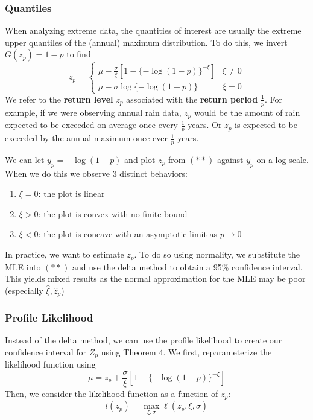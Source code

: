 \documentclass{article}
\theoremstyle{definition}
\theoremstyle{definition}
\def\l{\ell}
\begin{document}
\subsubsection{Quantiles}
When analyzing extreme data, the quantities of interest are usually the extreme upper quantiles of the (annual) maximum distribution. To do this, we invert $G(z_p)=1-p$ to find
\[z_p=\begin{cases} \mu-\frac{\sigma}{\xi}[1-\{-\log(1-p)\}^{-\xi}] & \xi\neq 0\\
\mu-\sigma\log\{-\log(1-p)\}&\xi= 0
\end{cases} \tag{**}\]
We refer to the \textbf{return level} $z_p$ associated with the \textbf{return period} $\frac{1}{p}$. For example, if we were observing annual rain data, $z_p$ would be the amount of rain  expected to be exceeded on average once every  $\frac{1}{p}$ years. Or $z_p$ is expected to be exceeded by the annual maximum once ever  $\frac{1}{p}$ years.

We can let $y_p=-\log(1-p)$ and plot $z_p$ from $(**)$ against $y_p$ on a log scale. When we do this we observe 3 distinct behaviors:
\begin{enumerate}
    \item $\xi=0$: the plot is linear
    \item $\xi>0$: the plot is convex with no finite bound
    \item $\xi<0$: the plot is concave with an asymptotic limit as $p\rightarrow 0$
\end{enumerate}
In practice, we want to estimate $z_p$. To do so using normality, we substitute the MLE into $(**)$ and use the delta method to obtain a 95\% confidence interval. This yields mixed results as the normal approximation for the MLE may be poor (especially $\hat{\xi},\hat{z}_p $)
\subsubsection{Profile Likelihood}
Instead of the delta method, we can use the profile likelihood to create our confidence interval for $Z_p$ using Theorem 4. We first, reparameterize the likelihood function using
\[\mu=z_p+\frac{\sigma}{\xi}[1-\{-\log(1-p)\}^{-\xi}]\]
Then, we consider the likelihood function as a function of $z_p$:
\[l(z_p)= \max_{\xi, \sigma}\l(z_p,\xi, \sigma)\]
\end{document}
